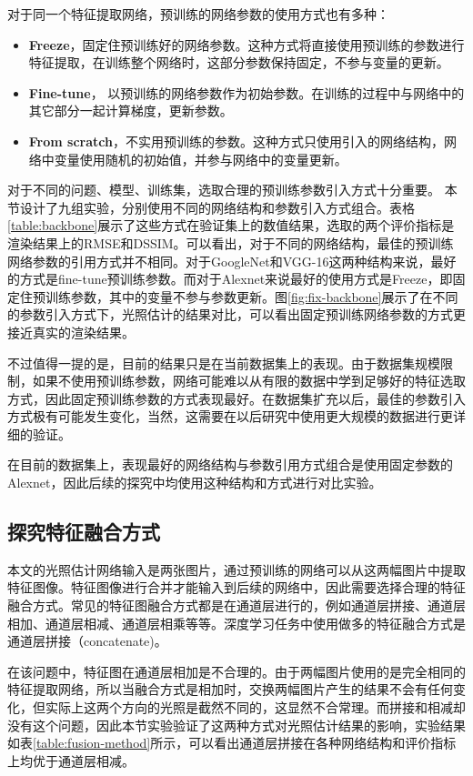 
对于同一个特征提取网络，预训练的网络参数的使用方式也有多种：
\begin{itemize}
    \item \textbf{Freeze}，固定住预训练好的网络参数。这种方式将直接使用预训练的参数进行特征提取，在训练整个网络时，这部分参数保持固定，不参与变量的更新。
    \item \textbf{Fine-tune}， 以预训练的网络参数作为初始参数。在训练的过程中与网络中的其它部分一起计算梯度，更新参数。
    \item \textbf{From scratch}，不实用预训练的参数。这种方式只使用引入的网络结构，网络中变量使用随机的初始值，并参与网络中的变量更新。
\end{itemize}

对于不同的问题、模型、训练集，选取合理的预训练参数引入方式十分重要。
本节设计了九组实验，分别使用不同的网络结构和参数引入方式组合。表格\ref{table:backbone}展示了这些方式在验证集上的数值结果，选取的两个评价指标是渲染结果上的RMSE和DSSIM。可以看出，对于不同的网络结构，最佳的预训练网络参数的引用方式并不相同。对于GoogleNet和VGG-16这两种结构来说，最好的方式是fine-tune预训练参数。而对于Alexnet来说最好的使用方式是Freeze，即固定住预训练参数，其中的变量不参与参数更新。图\ref{fig:fix-backbone}展示了在不同的参数引入方式下，光照估计的结果对比，可以看出固定预训练网络参数的方式更接近真实的渲染结果。


不过值得一提的是，目前的结果只是在当前数据集上的表现。由于数据集规模限制，如果不使用预训练参数，网络可能难以从有限的数据中学到足够好的特征选取方式，因此固定预训练参数的方式表现最好。在数据集扩充以后，最佳的参数引入方式极有可能发生变化，当然，这需要在以后研究中使用更大规模的数据进行更详细的验证。

在目前的数据集上，表现最好的网络结构与参数引用方式组合是使用固定参数的Alexnet，因此后续的探究中均使用这种结构和方式进行对比实验。
\subsection{探究特征融合方式}

本文的光照估计网络输入是两张图片，通过预训练的网络可以从这两幅图片中提取特征图像。特征图像进行合并才能输入到后续的网络中，因此需要选择合理的特征融合方式。常见的特征图融合方式都是在通道层进行的，例如通道层拼接、通道层相加、通道层相减、通道层相乘等等。深度学习任务中使用做多的特征融合方式是通道层拼接（concatenate)。

在该问题中，特征图在通道层相加是不合理的。由于两幅图片使用的是完全相同的特征提取网络，所以当融合方式是相加时，交换两幅图片产生的结果不会有任何变化，但实际上这两个方向的光照是截然不同的，这显然不合常理。而拼接和相减却没有这个问题，因此本节实验验证了这两种方式对光照估计结果的影响，实验结果如表\ref{table:fusion-method}所示，可以看出通道层拼接在各种网络结构和评价指标上均优于通道层相减。


